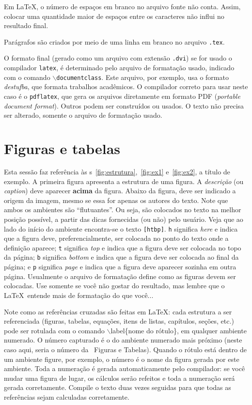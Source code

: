 Em \LaTeX, o número de espaços em branco no arquivo fonte não conta. Assim, colocar uma quantidade maior de espaços entre os caracteres não
influi no resultado final.

Parágrafos são criados por meio de uma linha em branco no arquivo \texttt{.tex}.

O formato final (gerado como um arquivo com extensão \texttt{.dvi}) se for usado o compilador \texttt{\small latex}, é determinado pelo arquivo de formatação usado, indicado com o comando \texttt{$\backslash$documentclass}. Este arquivo, por exemplo, usa o formato \emph{destufba}, que formata trabalhos acadêmicos. O compilador correto para usar neste caso é o \texttt{\small pdflatex}, que gera os arquivos diretamente em formato PDF (\emph{portable document format}). Outros podem ser construídos ou usados. O texto não precisa ser alterado, somente o arquivo de formatação usado.


\section{Figuras e tabelas}
\label{sec-figuras}

Esta sessão faz referência às \figurename s~\ref{fig:estrutura},~\ref{fig:ex1} e~\ref{fig:ex2}, a título de exemplo. A primeira figura apresenta a estrutura de uma figura. A \emph{descrição} (ou \emph{caption}) deve aparecer \textbf{acima} da figura. Abaixo da figura, deve ser indicado a origem da imagem, mesmo se essa for apenas os autores do texto. Note que ambos os ambientes são ``flutuantes''. Ou seja, são colocados no texto na melhor posição possível, a partir das dicas fornecidas (ou não) pelo usuário. Veja que ao lado do início do ambiente encontra-se o texto \texttt{[htbp]}. \texttt{h} significa \emph{here} e indica que a figura deve, preferencialmente, ser colocada no ponto do texto onde a definição aparece; \texttt{t} significa \emph{top} e indica que a figura deve ser colocada no topo da página; \texttt{b} significa \emph{bottom} e indica que a figura deve ser colocada ao final da página; e \texttt{p} significa \emph{page} e indica que a figura deve aparecer sozinha em outra página. Usualmente o arquivo de formatação define como as figuras devem ser colocadas. Use somente se você não gostar do resultado, mas lembre que o \LaTeX\ entende mais de formatação do que você...

Note como as referências cruzadas são feitas em \LaTeX: cada estrutura a ser referenciada (figuras, tabelas, equações, itens de listas, capítulos, seções, etc.) pode ser rotulada com o comando $\backslash$label\{nome do rótulo\}, em qualquer ambiente numerado. O número capturado é o do ambiente numerado mais próximo (neste caso aqui, seria o número da \sectionname\ Figuras e Tabelas). Quando o rótulo está dentro de um ambiente figure, por exemplo, o número é o nome da figura gerada por este ambiente. Toda a numeração é gerada automaticamente pelo compilador: se você mudar uma figura de lugar, os cálculos serão refeitos e toda a numeração será gerada corretamente. Compile o texto duas vezes seguidas para que todas as referências sejam calculadas corretamente.

